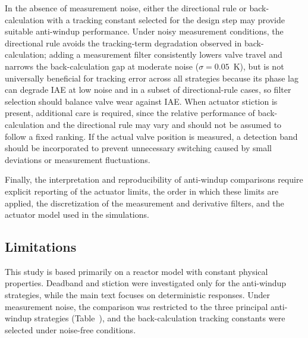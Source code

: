 In the absence of measurement noise, either the directional rule or back-calculation with a tracking constant selected for the design step may provide suitable anti-windup performance. Under noisy measurement conditions, the directional rule avoids the tracking-term degradation observed in back-calculation; adding a measurement filter consistently lowers valve travel and narrows the back-calculation gap at moderate noise ($\sigma = 0.05$~K), but is not universally beneficial for tracking error across all strategies because its phase lag can degrade IAE at low noise and in a subset of directional-rule cases, so filter selection should balance valve wear against IAE. When actuator stiction is present, additional care is required, since the relative performance of back-calculation and the directional rule may vary and should not be assumed to follow a fixed ranking. If the actual valve position is measured, a detection band should be incorporated to prevent unnecessary switching caused by small deviations or measurement fluctuations.

Finally, the interpretation and reproducibility of anti-windup comparisons require explicit reporting of the actuator limits, the order in which these limits are applied, the discretization of the measurement and derivative filters, and the actuator model used in the simulations.



\subsection{Limitations}
\label{subsec:limitations}
This study is based primarily on a reactor model with constant physical properties. Deadband and stiction were investigated only for the anti-windup strategies, while the main text focuses on deterministic responses. Under measurement noise, the comparison was restricted to the three principal anti-windup strategies (Table~), and the back-calculation tracking constants were selected under noise-free conditions.

